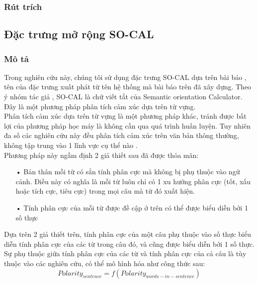 \subsubsection*{Rút trích}
\subsection{Đặc trưng mở rộng SO-CAL}
\subsubsection*{Mô tả}
Trong nghiên cứu này, chúng tôi sử dụng đặc trưng SO-CAL dựa trên bài báo \cite{taboada2011lexicon}, tên của đặc trưng xuất phát từ tên hệ thống mà bài báo trên đã xây dựng. Theo ý nhóm tác giả \cite{taboada2011lexicon}, SO-CAL là chữ viết tắt của Semantic orientation Calculator. Đây là một phương pháp phân tích cảm xúc dựa trên từ vựng.\\

Phân tích cảm xúc dựa trên từ vựng là một phương pháp khác, tránh được bất lợi của phương pháp học máy là không cần qua quá trình huấn luyện. Tuy nhiên đa số các nghiên cứu này đều phân tích cảm xúc trên văn bản thông thường, không tập trung vào 1 lĩnh vực cụ thể nào \cite{taboada2011lexicon}\cite{Zhang2011}\cite{ohana2009sentiment}\cite{Giachanou2016}. \\

Phương pháp này ngầm định 2 giả thiết sau đã được thỏa mãn:
\begin{itemize}
\item[•] Bản thân mỗi từ có sẳn tính phân cực mà không bị phụ thuộc vào ngữ cảnh. Điều này có nghĩa là mỗi từ luôn chỉ có 1 xu hướng phân cực (tốt, xấu hoặc tích cực, tiêu cực) trong mọi câu mà từ đó xuất hiện.
\item[•] Tính phân cực của mỗi từ được đề cập ở trên có thể được biểu diễn bởi 1 số thực
\end{itemize}
Dựa trên 2 giả thiết trên, tính phân cực của một câu phụ thuộc vào số thực biểu diễn tính phân cực của các từ trong câu đó, và cũng được biểu diễn bởi 1 số thực. Sự phụ thuộc giữa tính phân cực của các từ và tính phân cực của cả câu là tùy thuộc vào các nghiên cứu, có thể mô hình hóa như công thức sau:
\begin{equation}
Polarity_{sentence}=f(Polarity_{words-in-sentence})
\end{equation}
